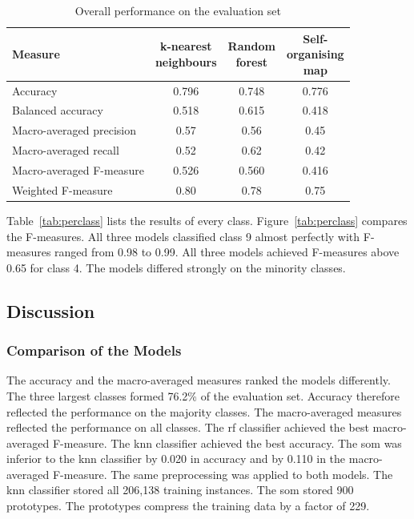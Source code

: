 \documentclass[conference]{IEEEtran}
\begin{document}
\begin{table}[!t]
\centering
\caption{Overall performance on the evaluation set}
\label{tab:overall}
\footnotesize
\begin{tabular}{lccc}
\toprule
\textbf{Measure} & \shortstack{\textbf{k-nearest}\\\textbf{neighbours}} & \shortstack{\textbf{Random}\\\textbf{forest}} & \shortstack{\textbf{Self-}\\\textbf{organising}\\\textbf{map}} \\
\midrule
Accuracy & 0.796 & 0.748 & 0.776 \\
Balanced accuracy & 0.518 & 0.615 & 0.418 \\
Macro-averaged precision & 0.57 & 0.56 & 0.45 \\
Macro-averaged recall & 0.52 & 0.62 & 0.42 \\
Macro-averaged F-measure & 0.526 & 0.560 & 0.416 \\
Weighted F-measure & 0.80 & 0.78 & 0.75 \\
\bottomrule
\end{tabular}
\end{table}

Table~\ref{tab:perclass} lists the results of every class.
Figure~\ref{tab:perclass} compares the F-measures.
All three models classified class 9 almost perfectly with F-measures ranged from 0.98 to 0.99.
All three models achieved F-measures above 0.65 for class 4.
The models differed strongly on the minority classes.

\subsection{Discussion}
\label{sub:res_disc}

\subsubsection{Comparison of the Models}

The accuracy and the macro-averaged measures ranked the models differently.
The three largest classes formed 76.2\% of the evaluation set.
Accuracy therefore reflected the performance on the majority classes.
The macro-averaged measures reflected the performance on all classes.
The \gls{rf} classifier achieved the best macro-averaged F-measure.
The \gls{knn} classifier achieved the best accuracy.
The \gls{som} was inferior to the \gls{knn} classifier by 0.020 in accuracy and by 0.110 in the macro-averaged F-measure.
The same preprocessing was applied to both models.
The \gls{knn} classifier stored all 206,138 training instances.
The \gls{som} stored 900 prototypes.
The prototypes compress the training data by a factor of 229.
\end{document}
